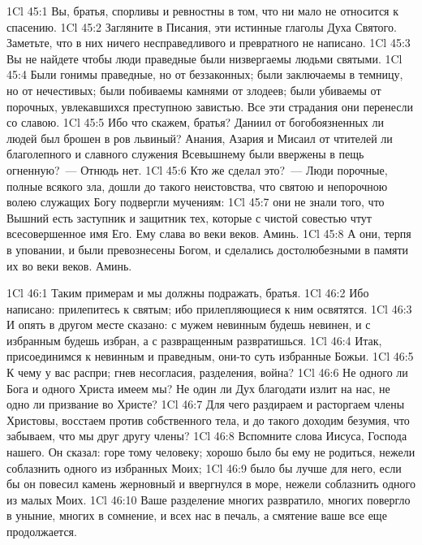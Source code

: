 \vs 1Cl 45:1
Вы, братья, спорливы и
ревностны в том, что ни мало не относится к спасению.
\vs 1Cl 45:2
Загляните в Писания, эти
истинные глаголы Духа Святого. Заметьте, что в них ничего несправедливого и
превратного не написано.
\vs 1Cl 45:3
Вы не найдете чтобы люди
праведные были низвергаемы людьми святыми.
\vs 1Cl 45:4
Были гонимы праведные, но
от беззаконных; были заключаемы в темницу, но от нечестивых; были побиваемы
камнями от злодеев; были убиваемы от порочных, увлекавшихся преступною
завистью. Все эти страдания они перенесли со славою.
\vs 1Cl 45:5
Ибо что скажем, братья?
Даниил от богобоязненных ли людей был брошен в ров львиный? Анания, Азария и
Мисаил от чтителей ли благолепного и славного служения Всевышнему были
ввержены в пещь огненную?~--- Отнюдь нет.
\vs 1Cl 45:6
Кто же сделал это?~--- Люди
порочные, полные всякого зла, дошли до такого неистовства, что святою и
непорочною волею служащих Богу подвергли мучениям:
\vs 1Cl 45:7
они не знали того, что
Вышний есть заступник и защитник тех, которые с чистой совестью чтут
всесовершенное имя Его. Ему слава во веки веков. Аминь.
\vs 1Cl 45:8
А они, терпя в уповании, и
были превознесены Богом, и сделались достолюбезными в памяти их во веки веков.
Аминь.

\vs 1Cl 46:1
Таким примерам и мы
должны подражать, братья.
\vs 1Cl 46:2
Ибо написано: прилепитесь
к святым; ибо прилепляющиеся к ним освятятся.
\vs 1Cl 46:3
И опять в другом месте
сказано: с мужем невинным будешь невинен, и с избранным будешь избран, а с
развращенным развратишься.
\vs 1Cl 46:4
Итак, присоединимся к
невинным и праведным, они-то суть избранные Божьи.
\vs 1Cl 46:5
К чему у вас распри; гнев
несогласия, разделения, война?
\vs 1Cl 46:6
Не одного ли Бога и одного
Христа имеем мы? Не один ли Дух благодати излит на нас, не одно ли призвание
во Христе?
\vs 1Cl 46:7
Для чего раздираем и
расторгаем члены Христовы, восстаем против собственного тела, и до такого
доходим безумия, что забываем, что мы друг другу члены?
\vs 1Cl 46:8
Вспомните слова Иисуса,
Господа нашего. Он сказал: горе тому человеку; хорошо было бы ему не
родиться, нежели соблазнить одного из избранных Моих;
\vs 1Cl 46:9
было бы лучше для него,
если бы он повесил камень жерновный и ввергнулся в море, нежели соблазнить
одного из малых Моих.
\vs 1Cl 46:10
Ваше разделение многих
развратило, многих повергло в уныние, многих в сомнение, и всех нас в печаль,
а смятение ваше все еще продолжается.

